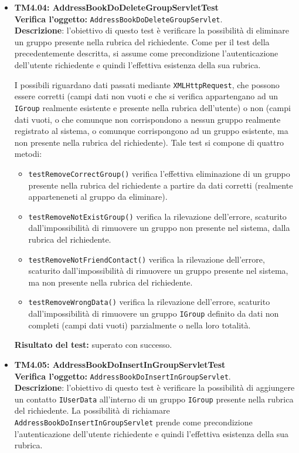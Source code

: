 \begin{itemize}
\item \textbf{TM4.04: AddressBookDoDeleteGroupServletTest}\\
\textbf{Verifica l'oggetto:} \texttt{AddressBookDoDeleteGroupServlet}.\\
\textbf{Descrizione}: l'obiettivo di questo test è verificare la possibilità di eliminare un gruppo presente nella rubrica del richiedente. Come per il test della  precedentemente descritta, si assume come precondizione l'autenticazione dell'utente richiedente e quindi l'effettiva esistenza della sua rubrica.

I possibili  riguardano dati passati mediante \texttt{XMLHttpRequest}, che possono essere corretti (campi dati non vuoti e che si verifica appartengano ad un \texttt{IGroup} realmente esistente e presente nella rubrica dell'utente) o non (campi dati vuoti, o che comunque non corrispondono a nessun gruppo realmente registrato al sistema, o comunque corrispongono ad un gruppo esistente, ma non presente nella rubrica del richiedente).
Tale test si compone di quattro metodi:
\begin{itemize}
\item \texttt{testRemoveCorrectGroup()} verifica l'effettiva eliminazione di un gruppo presente nella rubrica del richiedente a partire da dati corretti (realmente apparteneneti al gruppo da eliminare).
\item \texttt{testRemoveNotExistGroup()} verifica la rilevazione dell'errore, scaturito dall'impossibilità di rimuovere un gruppo non presente nel sistema, dalla rubrica del richiedente.
\item \texttt{testRemoveNotFriendContact()} verifica la rilevazione dell'errore, scaturito dall'impossibilità di rimuovere un gruppo presente nel sistema, ma non presente nella rubrica del richiedente. 
\item \texttt{testRemoveWrongData()} verifica la rilevazione dell'errore, scaturito dall'impossibilità di rimuovere un gruppo \texttt{IGroup} definito da dati non completi (campi dati vuoti) parzialmente o nella loro totalità.
\end{itemize}
\textbf{Risultato del test:} superato con successo.

\item \textbf{TM4.05: AddressBookDoInsertInGroupServletTest}\\
\textbf{Verifica l'oggetto:} \texttt{AddressBookDoInsertInGroupServlet}.\\
\textbf{Descrizione}: l'obiettivo di questo test è verificare la possibilità di aggiungere un contatto \texttt{IUserData} all'interno di un gruppo \texttt{IGroup} presente nella rubrica del richiedente. La possibilità di richiamare \texttt{AddressBookDoInsertInGroupServlet} prende come precondizione l'autenticazione dell'utente richiedente e quindi l'effettiva esistenza della sua rubrica.


\end{itemize}
